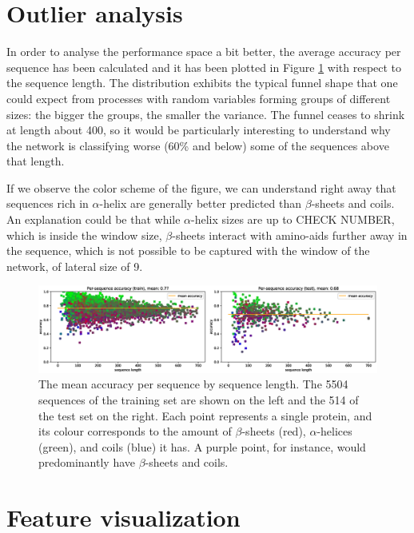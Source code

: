\section{Outlier analysis} \label{sect:outliers}

In order to analyse the performance space a bit better, the average accuracy per sequence has been calculated and it has been plotted in Figure \ref{fig:per_seq_acc} with respect to the sequence length. The distribution exhibits the typical funnel shape that one could expect from processes with random variables forming groups of different sizes: the bigger the groups, the smaller the variance. The funnel ceases to shrink at length about 400, so it would be particularly interesting to understand why the network is classifying worse (60\% and below) some of the sequences above that length.

If we observe the color scheme of the figure, we can understand right away that sequences rich in $\alpha$-helix are generally better predicted than $\beta$-sheets and coils. An explanation could be that while $\alpha$-helix sizes are up to CHECK NUMBER, which is inside the window size, $\beta$-sheets interact with amino-aids further away in the sequence, which is not possible to be captured with the window of the network, of lateral size of 9.

\begin{figure}
\centering
\includegraphics[width=1\linewidth]{Figures/per_seq_acc}
\caption{The mean accuracy per sequence by sequence length. The 5504 sequences of the training set are shown on the left and the 514 of the test set on the right. Each point represents a single protein, and its colour corresponds to the amount of $\beta$-sheets (red), $\alpha$-helices (green), and coils (blue) it has. A purple point, for instance, would predominantly have $\beta$-sheets and coils.}
\label{fig:per_seq_acc}
\end{figure}

\section{Feature visualization}

